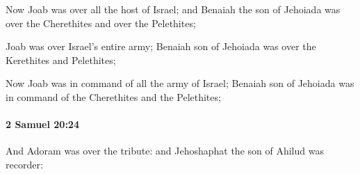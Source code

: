 			\begin{versebox}
					\item[BHS] 
					\item[ASV] Now Joab was over all the host of Israel; and Benaiah the son of Jehoiada was over the Cherethites and over the Pelethites;
					\item[NIV] Joab was over Israel’s entire army; Benaiah son of Jehoiada was over the Kerethites and Pelethites;
					\item[NRSV] Now Joab was in command of all the army of Israel; Benaiah son of Jehoiada was in command of the Cherethites and the Pelethites;
			\end{versebox}

		\paragraph{2 Samuel 20:24} %
			\label{2SAMUEL-20-24}

			And Adoram was over the tribute: and Jehoshaphat the son of Ahilud was recorder:

